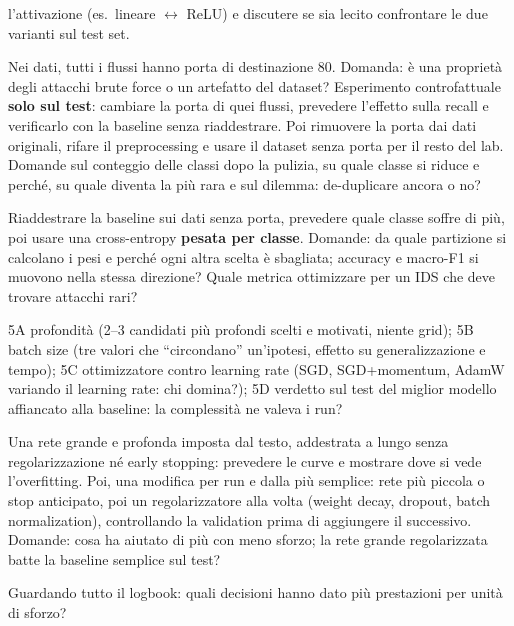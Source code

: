 \begin{description}[style=nextline,leftmargin=1.2em]
  l'attivazione (es.\ lineare $\leftrightarrow$ ReLU) e discutere se sia lecito confrontare le due
  varianti sul test set.
\item[Task 3 -- Una feature che distorce il modello]
  Nei dati, tutti i flussi  hanno porta di destinazione 80. Domanda: è una proprietà
  degli attacchi brute force o un artefatto del dataset? Esperimento controfattuale \textbf{solo sul
  test}: cambiare la porta di quei flussi, prevedere l'effetto sulla recall e verificarlo con la
  baseline senza riaddestrare. Poi rimuovere la porta dai dati originali, rifare il preprocessing e
  usare il dataset senza porta per il resto del lab. Domande sul conteggio delle classi dopo la
  pulizia, su quale classe si riduce e perché, su quale diventa la più rara e sul dilemma: de-duplicare
  ancora o no?
\item[Task 4 -- La classe rara: loss e sbilanciamento]
  Riaddestrare la baseline sui dati senza porta, prevedere quale classe soffre di più, poi usare una
  cross-entropy \textbf{pesata per classe}. Domande: da quale partizione si calcolano i pesi e perché
  ogni altra scelta è sbagliata; accuracy e macro-F1 si muovono nella stessa direzione? Quale metrica
  ottimizzare per un IDS che deve trovare attacchi rari?
\item[Task 5 -- Iperparametri (circa 10 run in tutto)]
  5A profondità (2--3 candidati più profondi scelti e motivati, niente grid); 5B batch size (tre
  valori che ``circondano'' un'ipotesi, effetto su generalizzazione e tempo); 5C ottimizzatore contro
  learning rate (SGD, SGD+momentum, AdamW variando il learning rate: chi domina?); 5D verdetto sul test
  del miglior modello affiancato alla baseline: la complessità ne valeva i run?
\item[Task 6 -- Ottimizzazioni]
  Una rete grande e profonda imposta dal testo, addestrata a lungo senza regolarizzazione né early
  stopping: prevedere le curve e mostrare dove si vede l'overfitting. Poi, una modifica per run e dalla
  più semplice: rete più piccola o stop anticipato, poi un regolarizzatore alla volta (weight decay,
  dropout, batch normalization), controllando la validation prima di aggiungere il successivo.
  Domande: cosa ha aiutato di più con meno sforzo; la rete grande regolarizzata batte la baseline
  semplice sul test?
\item[Riflessione finale]
  Guardando tutto il logbook: quali decisioni hanno dato più prestazioni per unità di sforzo?
\end{description}

